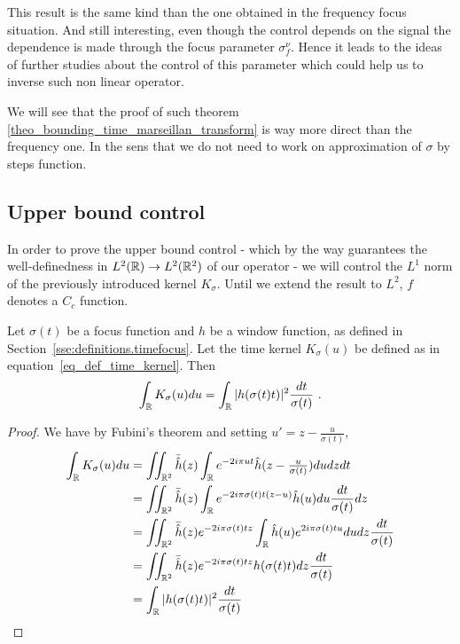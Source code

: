 This result is the same kind than the one obtained in the frequency focus situation. And still interesting, even though the control depends on the signal the dependence is made through the focus parameter $\sigma_f^\nu$. Hence it leads to the ideas of further studies about the control of this parameter which could help us to inverse such non linear operator.

We will see that the proof of such theorem \ref{theo_bounding_time_marseillan_transform} is way more direct than the frequency one. In the sens that we do not need to work on approximation of $\sigma$ by steps function.


\subsection{Upper bound control}

In order to prove the upper bound control - which by the way guarantees the well-definedness in $L^2(\mathbb{R})\rightarrow L^2(\mathbb{R}^2)$ of our operator - we will control the $L^1$ norm of the previously introduced kernel $K_\sigma$. Until we extend the result to $L^2$, $f$ denotes a $C_c$ function.

\begin{lemma}\label{lemma_norm_control_time_kernel_L1}
	Let $\sigma(t)$ be a focus function and $h$ be a window function, as defined in Section~\ref{sse:definitions.timefocus}. Let the time kernel $K_\sigma(u)$ be defined as in equation~\eqref{eq_def_time_kernel}.
	Then
	\begin{equation}
		\int_{\mathbb{R}} K_\sigma(u)du = \int_{\mathbb{R}} |h(\sigma(t)t)|^2 \frac{dt}{\sigma(t)}\ .
	\end{equation}
\end{lemma}
\begin{proof}
	We have by Fubini's theorem and setting $u' = z - \tfrac{u}{\sigma(t)}$,
	\begin{align*}
		\int_{\mathbb{R}} K_\sigma(u)du & = \iint_{\mathbb{R}^2} \bar{\hat{h}}(z)\int_{\mathbb{R}} e^{-2i\pi ut}\hat{h}(z-\tfrac{u}{\sigma(t)}) du dzdt \\
		& = \iint_{\mathbb{R}^2} \bar{\hat{h}}(z) \int_{\mathbb{R}} e^{-2i\pi \sigma(t)t(z-u)}\hat{h}(u) du\frac{dt}{\sigma(t)}dz \\
		& = \iint_{\mathbb{R}^2} \bar{\hat{h}}(z)e^{-2i\pi \sigma(t)tz}\int_{\mathbb{R}}\hat{h}(u)e^{2i\pi \sigma(t)tu}dudz\frac{dt}{\sigma(t)}\\
		& = \iint_{\mathbb{R}^2} \bar{\hat{h}}(z)e^{-2i\pi \sigma(t)tz}h(\sigma(t)t) dz\frac{dt}{\sigma(t)} \\
		& = \int_{\mathbb{R}} |h(\sigma(t)t)|^2\frac{dt}{\sigma(t)}
	\end{align*}
\end{proof}

